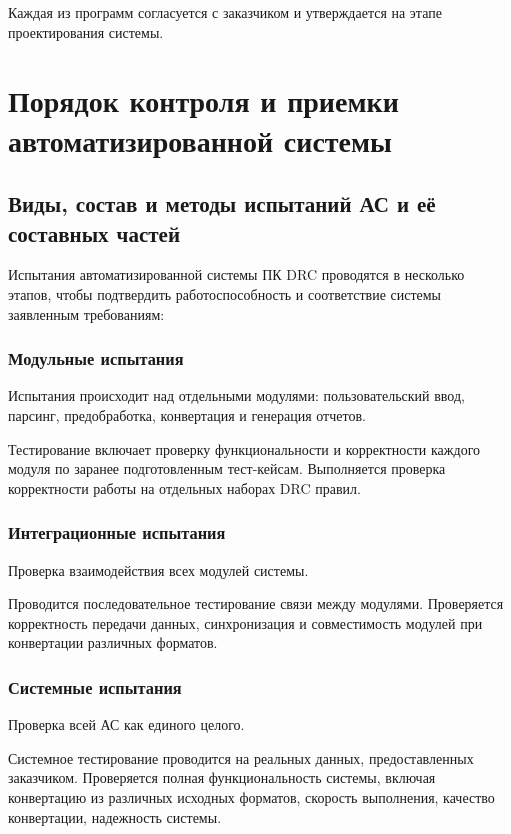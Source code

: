 Каждая из программ согласуется с заказчиком
и утверждается на этапе проектирования системы.

\section{Порядок контроля и приемки автоматизированной системы}

\subsection{Виды, состав и методы испытаний АС и её составных частей}

Испытания автоматизированной системы ПК DRC проводятся в несколько этапов,
чтобы подтвердить работоспособность
и соответствие системы заявленным требованиям:

\subsubsection{Модульные испытания}

Испытания происходит над отдельными модулями:
пользовательский ввод, парсинг, предобработка,
конвертация и генерация отчетов.

Тестирование включает проверку функциональности
и корректности каждого модуля по заранее подготовленным тест-кейсам.
Выполняется проверка корректности работы на отдельных наборах DRC правил.
  
\subsubsection{Интеграционные испытания}

Проверка взаимодействия всех модулей системы.

Проводится последовательное тестирование связи между модулями.
Проверяется корректность передачи данных, синхронизация
и совместимость модулей при конвертации различных форматов.

\subsubsection{Системные испытания}

Проверка всей АС как единого целого.

Системное тестирование проводится на реальных данных,
предоставленных заказчиком.
Проверяется полная функциональность системы,
включая конвертацию из различных исходных форматов,
скорость выполнения, качество конвертации, надежность системы.

